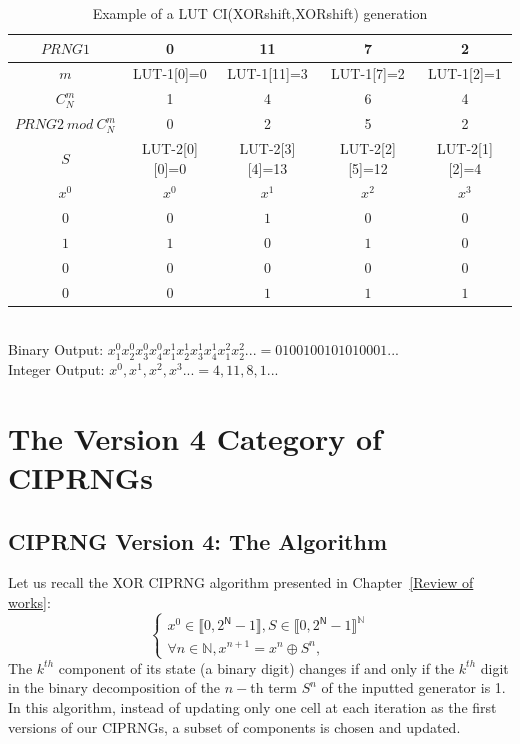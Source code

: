\begin{tiny}
\begin{table} 
\centering
\begin{tabular}{|c|c|c|c|c|}
\hline
$PRNG1$ &0 &11 &7&2 \\ \hline
$m$ &LUT-1[0]=0&LUT-1[11]=3&LUT-1[7]=2&LUT-1[2]=1  \\ \hline
$C_N^m$  & 1 & 4&6&4\\ \hline
$PRNG2~ mod~ C_N^m$  & 0 & 2 & 5 & 2\\ \hline
$S$  & LUT-2[0][0]=0& LUT-2[3][4]=13&LUT-2[2][5]=12&LUT-2[1][2]=4  \\ \hline
$x^{0}$ & $x^{0}$ &$x^{1}$ &$x^{2}$& $x^{3}$  \\
$0$ & $0$&$1$ & $0$& $0$\\
$1$ & $1$&$0$ & $1$& $0$\\
$0$ & $0$&$0$ & $0$& $0$ \\
$0$ & $0$&$1$ & $1$& $1$\\
\hline
\end{tabular}\\
\vspace{0.5cm}
Binary Output: $x_1^{0}x_2^{0}x_3^{0}x_4^{0}x_1^{1}x_2^{1}x_3^{1}x_4^{1}x_1^{2}x_2^{2}... = 0100100101010001...$\\
Integer Output:
$x^{0},x^{1},x^{2},x^{3}... = 4,11,8,1...$
\caption{Example of a LUT CI(XORshift,XORshift) generation}
\label{lut table application example}
\end{table}
\end{tiny}


\section{The Version 4 Category of CIPRNGs}
\subsection{CIPRNG Version 4: The Algorithm}

Let us recall the XOR CIPRNG algorithm presented in Chapter~\ref{Review of works}:
\begin{equation}
\left\{
\begin{array}{l}
x^0 \in \llbracket 0, 2^\mathsf{N}-1 \rrbracket, S \in \llbracket 0, 2^\mathsf{N}-1 \rrbracket^\mathds{N} \\
\forall n \in \mathds{N}, x^{n+1} = x^{n} \oplus S^n,
\end{array}
\right.
\label{equation Oplus12}
\end{equation}
The $k^{th}$ component of its state (a binary digit) changes if and only if the $k^{th}$ digit in the 
binary decomposition of the $n-$th term $S^n$ of the inputted generator is 1. In this algorithm, instead of updating only one cell at each iteration as the first versions of our CIPRNGs, a subset of components is chosen and updated.

